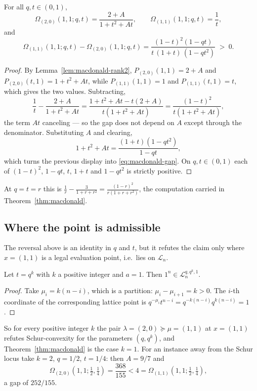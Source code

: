 \begin{proposition}\label{prop:macdonald-general}
For all $q,t\in(0,1)$,
\[
\Omega_{(2,0)}(1,1;q,t)=\frac{2+A}{1+t^2+At},
\qquad
\Omega_{(1,1)}(1,1;q,t)=\frac1t,
\]
and
\begin{equation}\label{eq:macdonald-gap}
\Omega_{(1,1)}(1,1;q,t)-\Omega_{(2,0)}(1,1;q,t)
=\frac{(1-t)^2(1-qt)}{t\,(1+t)\,(1-qt^2)}\;>\;0 .
\end{equation}
\end{proposition}
\begin{proof}
By Lemma~\ref{lem:macdonald-rank2}, $P_{(2,0)}(1,1)=2+A$ and
$P_{(2,0)}(t,1)=1+t^2+At$, while $P_{(1,1)}(1,1)=1$ and $P_{(1,1)}(t,1)=t$,
which gives the two values.  Subtracting,
\[
\frac1t-\frac{2+A}{1+t^2+At}
=\frac{1+t^2+At-t(2+A)}{t(1+t^2+At)}
=\frac{(1-t)^2}{t(1+t^2+At)},
\]
the term $At$ canceling --- so the gap does not depend on $A$ except through
the denominator.  Substituting $A$ and clearing,
\[
1+t^2+At=\frac{(1+t)(1-qt^2)}{1-qt},
\]
which turns the previous display into \eqref{eq:macdonald-gap}.  On $q,t\in(0,1)$
each of $(1-t)^2$, $1-qt$, $t$, $1+t$ and $1-qt^2$ is strictly positive.
\end{proof}

At $q=t=r$ this is $\tfrac1r-\tfrac3{1+r+r^2}=\tfrac{(1-r)^2}{r(1+r+r^2)}$, the
computation carried in Theorem~\ref{thm:macdonald}.

\subsection*{Where the point is admissible}

The reversal above is an identity in $q$ and $t$, but it refutes the claim only
where $x=(1,1)$ is a legal evaluation point, i.e.\ lies on $\mathcal L_n$.

\begin{lemma}\label{lem:macdonald-lattice}
Let $t=q^k$ with $k$ a positive integer and $a=1$.  Then
$1^n\in\mathcal L_n^{q,q^k,1}$.
\end{lemma}
\begin{proof}
Take $\mu_i=k(n-i)$, which is a partition: $\mu_i-\mu_{i+1}=k>0$.  The $i$-th
coordinate of the corresponding lattice point is
$q^{-\mu_i}t^{n-i}=q^{-k(n-i)}q^{k(n-i)}=1$.
\end{proof}

So for every positive integer $k$ the pair $\lambda=(2,0)\succeq\mu=(1,1)$ at
$x=(1,1)$ refutes Schur-convexity for the parameters $(q,q^k)$, and
Theorem~\ref{thm:macdonald} is the case $k=1$.  For an instance away from the Schur
locus take $k=2$, $q=1/2$, $t=1/4$: then $A=9/7$ and
\[
\Omega_{(2,0)}(1,1;\tfrac12,\tfrac14)=\frac{368}{155}<4=\Omega_{(1,1)}(1,1;\tfrac12,\tfrac14),
\]
a gap of $252/155$.

